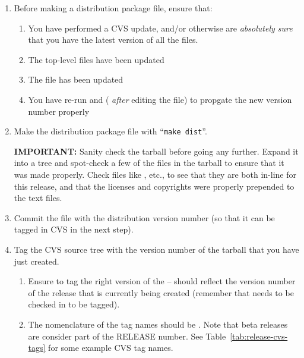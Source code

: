 \begin{enumerate}

\item Before making a distribution package file, ensure that:

  \begin{enumerate}
  \item You have performed a CVS update, and/or otherwise are {\em
      absolutely sure} that you have the latest version of all the
    files.
  \item The top-level  files have been updated
  \item The  file has been updated
  \item You have re-run  and  ({\em
      after} editing the  file) to propgate the new
    version number properly
  \end{enumerate}

\item Make the distribution package file with ``{\tt make dist}''.
  
  {\bf IMPORTANT:} Sanity check the tarball before going any further.
  Expand it into a tree and spot-check a few of the files in the
  tarball to ensure that it was made properly.  Check files like
  , etc., to see that they are both in-line for this
  release, and that the licenses and copyrights were properly
  prepended to the text files.
  
\item Commit the  file with the distribution version
  number (so that it can be tagged in CVS in the next step).

\item Tag the CVS source tree with the version number of the tarball
  that you have just created.  

  \begin{enumerate}
  \item Ensure to tag the right version of the  --
     should reflect the version number of the release
    that is currently being created (remember that 
    needs to be checked in to be tagged).

  \item The nomenclature of the tag names should be
    .  Note that beta releases are
    consider part of the RELEASE number.  See
    Table~\ref{tab:release-cvs-tags} for some example CVS tag names.


\end{enumerate}
\end{enumerate}
